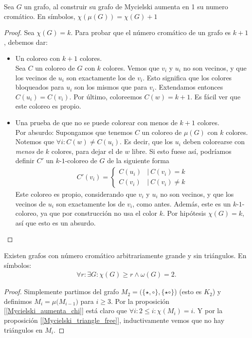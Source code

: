 \begin{proposition}\label{Mycielski_aumenta_chi}
Sea $G$ un grafo, al construir su grafo de Mycielski aumenta en 1 su numero cromático. En símbolos,
$\chi({\mu(G)}) = \chi(G) + 1$
\end{proposition}

\begin{proof}
Sea $\chi(G) = k$. Para probar que el número cromático de un grafo es $k+1$, debemos dar:
\begin{itemize}
    \item Un coloreo con $k+1$ colores.\\
    Sea $C$ un coloreo de $G$ con $k$ colores. Vemos que $v_i$ y $u_i$ no son vecinos, y que los vecinos de $u_i$ son exactamente los de $v_i$. Esto significa que los colores bloqueados para $u_i$ son los mismos que para $v_i$. Extendamos entonces $C(u_i) = C(v_i)$. Por último, coloreemos $C(w) = k+1$. Es fácil ver que este coloreo es propio.
    
    \item Una prueba de que no se puede colorear con menos de $k+1$ colores.\\
    Por absurdo: Supongamos que tenemos $C$ un coloreo de $\mu(G)$ con $k$ colores. Notemos que $\forall i \colon C(w) \neq C(u_i)$. Es decir, que los $u_i$ deben colorearse con \emph{menos} de $k$ colores, para dejar el de $w$ libre. Si esto fuese así, podríamos definir $C'$ un $k$-$1$-coloreo de $G$ de la siguiente forma
    \begin{align}
           C'(v_i) =
        \begin{cases}
            C(u_i) & |\ C(v_i) = k\\
            C(v_i) & |\ C(v_i) \neq k
        \end{cases}
    \end{align}
    Este coloreo es propio, considerando que $v_i$ y $u_i$ no son vecinos, y que los vecinos de $u_i$ son exactamente los de $v_i$, como antes.
    Además, este es un $k$-$1$-coloreo, ya que por construcción no usa el color $k$. Por hipótesis $\chi(G) = k$, así que esto es un absurdo.
\end{itemize}
\end{proof}

\begin{proposition}
Existen grafos con número cromático arbitrariamente grande y sin triángulos. En símbolos:
\begin{align}
    \forall r \colon \exists G \colon \chi(G) \ge r \wedge \omega(G) = 2.
\end{align}
\end{proposition}

\begin{proof}
Simplemente partimos del grafo $M_2 = (\{\star, \circ\}, \{\star\circ\}$) (esto es $K_2$) y definimos $M_i = \mu({M_{i-1})}$ para $i \ge 3$. Por la proposición [\ref{Mycielski_aumenta_chi}] está claro que $\forall i \colon 2 \le i : \chi(M_i) = i$. Y por la proposición [\ref{Mycielski_triangle_free}], inductivamente vemos que no hay triángulos en $M_i$.
\end{proof}
